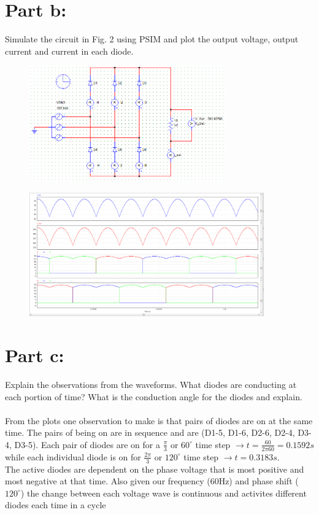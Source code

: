 \documentclass{article}
\begin{document}
\section*{Part b:}
Simulate the circuit in Fig. 2 using PSIM and plot the output voltage, output current and current in each diode. 
\begin{figure}[h]
    \centering
    \includegraphics[width=0.75\textwidth]{Psim-Q3}
    \label{PSIM circuit q3}
\end{figure}
\begin{figure}[h]
    \centering
    \includegraphics[width=0.9\textwidth]{psim-q3-Graph}
    \label{PSIM circuit q3}
\end{figure}

\section*{Part c:}
Explain the observations from the waveforms. What diodes are conducting at each portion of time? What is the conduction angle for the diodes and explain. \\ \\
From the plots one observation to make is that pairs of diodes are on at the same time. The pairs of being on are in sequence and are (D1-5, D1-6, D2-6, D2-4, D3-4, D3-5). Each pair of diodes are on for a $\frac{\pi}{3}$ or $60^{\circ} $ time step $\rightarrow t=\frac{60}{2\pi60 }= 0.1592 s$ while each individual diode is on for $\frac{2 \pi}{3}$ or $120^{\circ} $ time step $\rightarrow t = 0.3183s $. \\
The active diodes are dependent on the phase voltage that is most positive and most negative at that time. Also given our frequency (60Hz) and phase shift ($120^{\circ}$) the change between each voltage wave is continuous and activites different diodes each time in a cycle
\end{document}
